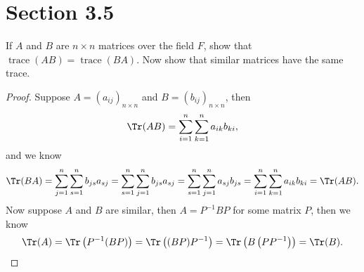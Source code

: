 \section*{Section 3.5}
\begin{problem}
If $A$ and $B$ are $n\times n$ matrices over the field $F$, show that $\operatorname{trace}(AB)=\operatorname{trace}(BA)$. Now show that similar matrices have the same trace.
\end{problem}
\begin{proof}
    Suppose \(A = (a_{ij})_{n \times n}\) and \(B = \left( b_{ij} \right)_{n \times n} \), then 
    \[
        \Tr (AB) = \sum_{i=1}^{n} \sum_{k=1}^n  a_{ik} b_{ki}, 
    \] and we know 
    \[
        \Tr (BA) = \sum_{j=1}^n \sum_{s=1}^n b_{js} a_{sj} = \sum_{s=1}^n \sum_{j=1}^n b_{js} a_{sj} = \sum_{s=1}^n \sum_{j=1}^n a_{sj} b_{js} = \sum_{i=1}^n \sum_{k=1}^n a_{ik} b_{ki} = \Tr (AB).        
    \] Now suppose \(A\) and \(B\) are similar, then \(A = P^{-1} B P \) for some matrix \(P\), then we know 
    \[
        \Tr (A) = \Tr \left( P^{-1} (B P) \right) = \Tr \left( (B P) P^{-1} \right) = \Tr \left( B \left( P P^{-1} \right)  \right) = \Tr (B).
    \]    
\end{proof}


